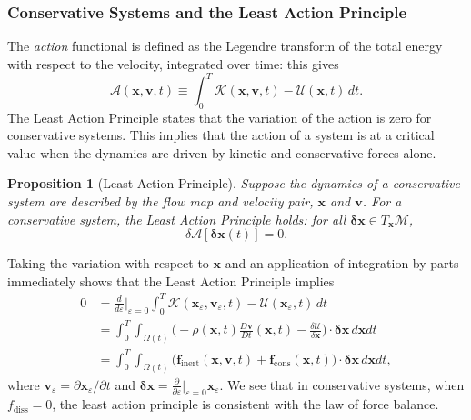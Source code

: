 \documentclass[final,10pt]{article}
\newtheorem{proposition}{Proposition}
\begin{document}
\subsubsection{Conservative Systems and the Least Action Principle}
The \emph{action} functional is defined as the Legendre transform of the total energy with respect to the velocity, integrated over time: this gives
\[
	\mathcal A(\bm x, \bm v, t)		\equiv	\int_0^T \mathcal K(\bm x, \bm v, t) - \mathcal U(\bm x, t) \, dt.
\]
The Least Action Principle states that the variation of the action is zero for conservative systems.
This implies that the action of a system is at a critical value when the dynamics are driven by kinetic and conservative forces alone.
\begin{proposition}[Least Action Principle]
Suppose the dynamics of a conservative system are described by the flow map and velocity pair, $\bm x$ and $\bm v$.
For a conservative system, the Least Action Principle holds: for all $\bm \delta \bm x \in T_{\bm x}\mathcal M$,
\[
	\delta \mathcal{A}[\bm \delta \bm x(t)]	=	0.
\]
\end{proposition}

Taking the variation with respect to $\bm x$ and an application of integration by parts immediately shows that the Least Action Principle implies
\begin{align*}	\label{least action}
	0 	&= 	\frac{d}{d\varepsilon}\bigg|_{\varepsilon=0} \int_0^T \mathcal K(\bm x_\varepsilon,\bm{v}_\varepsilon,t) 
																	- \mathcal U(\bm x_\varepsilon,t)\, dt	\\
		&=	\int_0^T \int_{\Omega(t)}	\bigg( -{\rho}({\bm x},t)\frac{D \bm v}{D t}({\bm x}, t) -\frac{\delta \mathcal{U}}{\delta \bm x} \bigg) \cdot \bm \delta \bm x \, d\bm x dt	\\
		&=	\int_0^T \int_{\Omega(t)} \bigg( \bm f_\mathrm{inert}(\bm x, \bm v, t) + \bm f_{\mathrm{cons}}(\bm x, t) \bigg) \cdot \bm \delta \bm x \, d\bm x dt,
\end{align*}
where $\bm v_\varepsilon = \partial \bm x_{\varepsilon} / \partial t$ and $\bm \delta \bm x = \frac{\partial}{\partial \varepsilon} \big|_{\varepsilon=0}\bm x_\varepsilon$.
We see that in conservative systems, when $f_\mathrm{diss} = 0$, the least action principle is consistent with the law of force balance.
\end{document}
